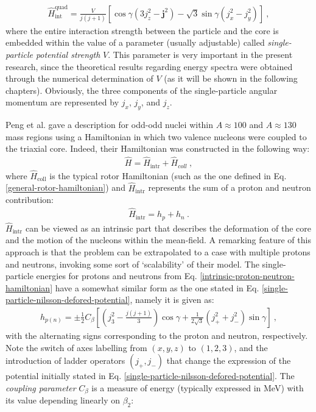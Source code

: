 \begin{align}
    \hat{H}_\text{int}^\text{quad}=\frac{V}{j(j+1)}\left[\cos\gamma(3j_z^2-\mathbf{j}^2)-\sqrt{3}\sin\gamma(j_x^2-j_y^2)\right]\ ,
    \label{single-particle-nilsson-defored-potential}
\end{align}
where the entire interaction strength between the particle and the core is embedded within the value of a parameter (usually adjustable) called \emph{single-particle potential strength} $V$. This parameter is very important in the present research, since the theoretical results regarding energy spectra were obtained through the numerical determination of $V$ (as it will be shown in the following chapters). Obviously, the three components of the single-particle angular momentum are represented by $j_x$, $j_y$, and $j_z$.

Peng et al. \cite{peng2003description} gave a description for odd-odd nuclei within $A\approx 100$ and $A\approx 130$ mass regions using a Hamiltonian in which two valence nucleons were coupled to the triaxial core. Indeed, their Hamiltonian was constructed in the following way:
\begin{align}
    \hat{H}=\hat{H}_\text{intr}+\hat{H}_{coll}\ ,
\end{align}
where $\hat{H}_\text{coll}$ is the typical rotor Hamiltonian (such as the one defined in Eq. \ref{general-rotor-hamiltonian}) and $\hat{H}_\text{intr}$ represents the sum of a proton and neutron contribution:
\begin{align}
    \hat{H}_\text{intr}=h_p+h_n\ .
    \label{intrinsic-proton-neutron-hamiltonian}
\end{align}
$\hat{H}_\text{intr}$ can be viewed as an intrinsic part that describes the deformation of the core and the motion of the nucleons within the mean-field. A remarking feature of this approach is that the problem can be extrapolated to a case with multiple protons and neutrons, invoking some sort of `scalability' of their model. The single-particle energies for protons and neutrons from Eq. \ref{intrinsic-proton-neutron-hamiltonian} have a somewhat similar form as the one stated in Eq. \ref{single-particle-nilsson-defored-potential}, namely it is given as:
\begin{align}
    h_{p(n)}=\pm\frac{1}{2}C_\beta\left[\left(j_3^2-\frac{j(j+1)}{3}\right)\cos\gamma+\frac{1}{2\sqrt{3}}(j_+^2+j_-^2)\sin\gamma\right]\ ,
    \label{single-particle-energies-hpn}
\end{align}
with the alternating signs corresponding to the proton and neutron, respectively. Note the switch of axes labelling from $(x,y,z)$ to $(1,2,3)$, and the introduction of ladder operators $(j_+,j_-)$ that change the expression of the potential initially stated in Eq. \ref{single-particle-nilsson-defored-potential}. The \emph{coupling parameter} $C_\beta$ is a measure of energy (typically expressed in MeV) with its value depending linearly on $\beta_2$:
